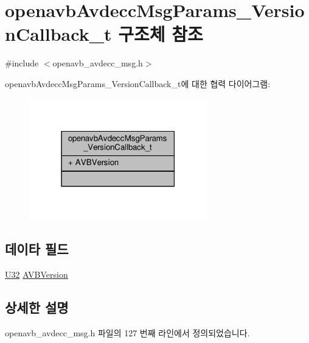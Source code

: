 \hypertarget{structopenavb_avdecc_msg_params___version_callback__t}{}\section{openavb\+Avdecc\+Msg\+Params\+\_\+\+Version\+Callback\+\_\+t 구조체 참조}
\label{structopenavb_avdecc_msg_params___version_callback__t}


{\ttfamily \#include $<$openavb\+\_\+avdecc\+\_\+msg.\+h$>$}



openavb\+Avdecc\+Msg\+Params\+\_\+\+Version\+Callback\+\_\+t에 대한 협력 다이어그램\+:
\nopagebreak
\begin{figure}[H]
\begin{center}
\leavevmode
\includegraphics[width=219pt]{structopenavb_avdecc_msg_params___version_callback__t__coll__graph}
\end{center}
\end{figure}
\subsection*{데이타 필드}
\begin{DoxyCompactItemize}
\item 
\hyperlink{openavb__types__base__pub_8h_a696390429f2f3b644bde8d0322a24124}{U32} \hyperlink{structopenavb_avdecc_msg_params___version_callback__t_ae20e1375c7e5bfda67ee623a7ff192b4}{A\+V\+B\+Version}
\end{DoxyCompactItemize}


\subsection{상세한 설명}


openavb\+\_\+avdecc\+\_\+msg.\+h 파일의 127 번째 라인에서 정의되었습니다.



